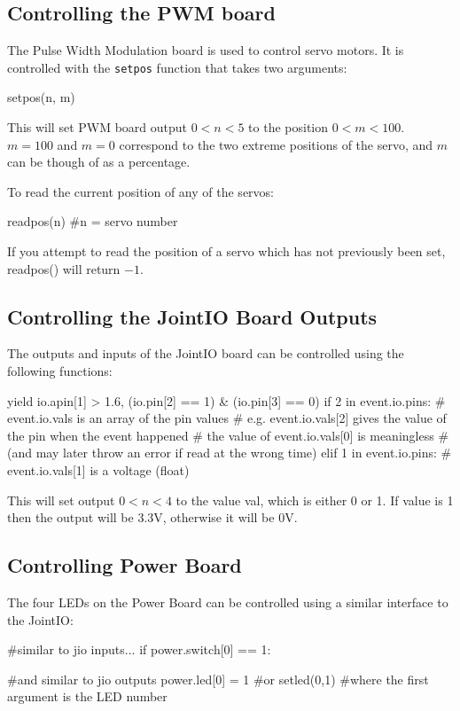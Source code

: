 \documentclass[a4paper, 12pt]{article}
\begin{document}
\subsection{Controlling the PWM board}
The Pulse Width Modulation board is used to control servo motors.  It is
controlled with the \texttt{setpos} function that takes two arguments:

\begin{verbatimtab}
setpos(n, m)
\end{verbatimtab}

This will set PWM board output $0<n<5$ to the position $0<m<100$. \(m = 100\) and \(m = 0\) correspond to the two extreme positions of the servo, and \(m\) can be though of as a percentage.

\vspace{12pt}
To read the current position of any of the servos:
\begin{verbatimtab}
readpos(n)	#n = servo number 
\end{verbatimtab}
If you attempt to read the position of a servo which has not previously been set, readpos() will return \(-1\).

\subsection{Controlling the JointIO Board Outputs}
The outputs and inputs of the JointIO board can be controlled using the following functions:
\begin{verbatimtab}
yield io.apin[1] > 1.6, (io.pin[2] == 1) & (io.pin[3] == 0)
if 2 in event.io.pins:
    # event.io.vals is an array of the pin values
    # e.g. event.io.vals[2] gives the value of the pin when the event happened
    # the value of event.io.vals[0] is meaningless
    # (and may later throw an error if read at the wrong time)
elif 1 in event.io.pins:
    # event.io.vals[1] is a voltage (float)
\end{verbatimtab}

This will set output $0<n<4$ to the value val, which is either 0 or 1.  If value is 1 then the output will be 3.3V, otherwise it will be 0V.

\subsection{Controlling Power Board}
The four LEDs on the Power Board can be controlled using a similar interface to the JointIO:
\begin{verbatimtab}
#similar to jio inputs...
if power.switch[0] == 1:
        
#and similar to jio outputs
power.led[0] = 1
#or
setled(0,1) #where the first argument is the LED number

\end{verbatimtab}
\end{document}

